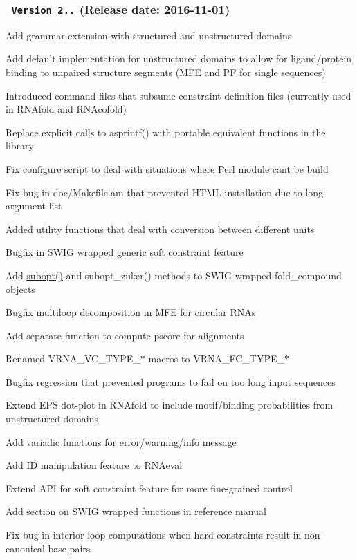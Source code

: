 \subsubsection*{\href{https://github.com/ViennaRNA/ViennaRNA/compare/v2.2.10...v2.3.0}{\texttt{ Version 2..}} (Release date\+: 2016-\/11-\/01)}


\begin{DoxyItemize}
\item Add grammar extension with structured and unstructured domains
\item Add default implementation for unstructured domains to allow for ligand/protein binding to unpaired structure segments (M\+FE and PF for single sequences)
\item Introduced command files that subsume constraint definition files (currently used in R\+N\+Afold and R\+N\+Acofold)
\item Replace explicit calls to asprintf() with portable equivalent functions in the library
\item Fix configure script to deal with situations where Perl module can\textquotesingle{}t be build
\item Fix bug in doc/\+Makefile.\+am that prevented H\+T\+ML installation due to long argument list
\item Added utility functions that deal with conversion between different units
\item Bugfix in S\+W\+IG wrapped generic soft constraint feature
\item Add \mbox{\hyperlink{group__subopt__wuchty_ga700f662506a233e42dd7fda74fafd40e}{subopt()}} and subopt\+\_\+zuker() methods to S\+W\+IG wrapped fold\+\_\+compound objects
\item Bugfix multiloop decomposition in M\+FE for circular R\+N\+As
\item Add separate function to compute pscore for alignments
\item Renamed V\+R\+N\+A\+\_\+\+V\+C\+\_\+\+T\+Y\+P\+E\+\_\+$\ast$ macros to V\+R\+N\+A\+\_\+\+F\+C\+\_\+\+T\+Y\+P\+E\+\_\+$\ast$
\item Bugfix regression that prevented programs to fail on too long input sequences
\item Extend E\+PS dot-\/plot in R\+N\+Afold to include motif/binding probabilities from unstructured domains
\item Add variadic functions for error/warning/info message
\item Add ID manipulation feature to R\+N\+Aeval
\item Extend A\+PI for soft constraint feature for more fine-\/grained control
\item Add section on S\+W\+IG wrapped functions in reference manual
\item Fix bug in interior loop computations when hard constraints result in non-\/canonical base pairs
\end{DoxyItemize}

